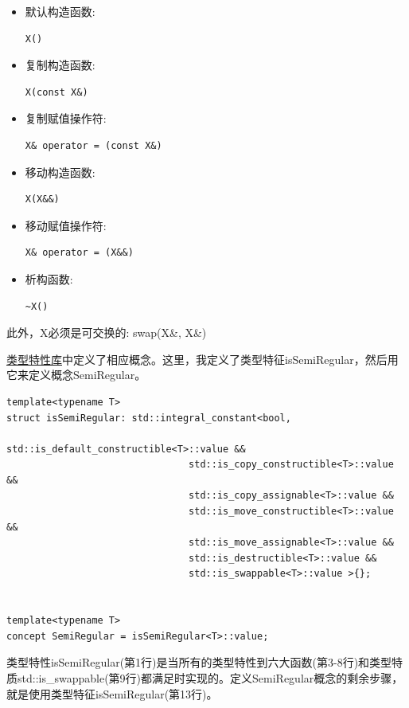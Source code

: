\begin{itemize}
\item 
默认构造函数: 
\begin{lstlisting}[style=styleCXX]
X()
\end{lstlisting}

\item 
复制构造函数:
\begin{lstlisting}[style=styleCXX]
X(const X&)
\end{lstlisting}

\item 
复制赋值操作符: 
\begin{lstlisting}[style=styleCXX]
X& operator = (const X&)
\end{lstlisting}

\item 
移动构造函数: 
\begin{lstlisting}[style=styleCXX]
X(X&&)
\end{lstlisting}

\item 
移动赋值操作符: 
\begin{lstlisting}[style=styleCXX]
X& operator = (X&&)
\end{lstlisting}

\item 
析构函数: 
\begin{lstlisting}[style=styleCXX]
~X()
\end{lstlisting}
\end{itemize}

此外，X必须是可交换的: swap(X\&, X\&)

\href{https://en.cppreference.com/w/cpp/header/type_traits}{类型特性库}中定义了相应概念。这里，我定义了类型特征isSemiRegular，然后用它来定义概念SemiRegular。

\begin{lstlisting}[style=styleCXX]
template<typename T>
struct isSemiRegular: std::integral_constant<bool,
								std::is_default_constructible<T>::value &&
								std::is_copy_constructible<T>::value &&
								std::is_copy_assignable<T>::value &&
								std::is_move_constructible<T>::value &&
								std::is_move_assignable<T>::value &&
								std::is_destructible<T>::value &&
								std::is_swappable<T>::value >{};


template<typename T>
concept SemiRegular = isSemiRegular<T>::value;
\end{lstlisting}

类型特性isSemiRegular(第1行)是当所有的类型特性到六大函数(第3-8行)和类型特质std::is\_swappable(第9行)都满足时实现的。定义SemiRegular概念的剩余步骤，就是使用类型特征isSemiRegular(第13行)。

